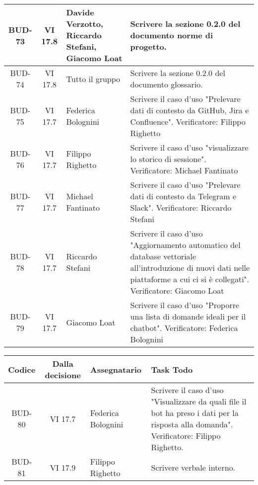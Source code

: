 \begin{table}[htbp]
\begin{tabular}{|c|c|p{}|p{}|}
    \hline
    BUD-73 & VI 17.8 & Davide Verzotto, Riccardo Stefani, Giacomo Loat & Scrivere la sezione 0.2.0 del documento norme di progetto. \\
    \hline
    BUD-74 & VI 17.8 & Tutto il gruppo & Scrivere la sezione 0.2.0 del documento glossario. \\
    \hline
    BUD-75 & VI 17.7 & Federica Bolognini & Scrivere il caso d'uso "Prelevare dati di contesto da GitHub, Jira e Confluence". Verificatore: Filippo Righetto \\
    \hline
    BUD-76 & VI 17.7 & Filippo Righetto & Scrivere il caso d'uso "visualizzare lo storico di sessione". Verificatore: Michael Fantinato \\
    \hline
    BUD-77 & VI 17.7 & Michael Fantinato & Scrivere il caso d'uso "Prelevare dati di contesto da Telegram e Slack". Verificatore: Riccardo Stefani\\
    \hline
    BUD-78 & VI 17.7 & Riccardo Stefani & Scrivere il caso d'uso "Aggiornamento automatico del database vettoriale all'introduzione di nuovi dati nelle piattaforme a cui ci si è collegati". Verificatore: Giacomo Loat\\
    \hline
    BUD-79 & VI 17.7 & Giacomo Loat & Scrivere il caso d'uso "Proporre una lista di domande ideali per il chatbot". Verificatore: Federica Bolognini\\
    \hline
\end{tabular}
\end{table}

\vspace{0.5cm}
\newpage
\begin{table}[htbp]
\centering
{}
\begin{tabular}{|c|c|p{}|p{}|}
    \hline
    \rowcolor[gray]{0.75}
    \textbf{Codice} & \textbf{Dalla decisione} & \textbf{Assegnatario} & \textbf{Task Todo} \\ 
    \hline
    BUD-80 & VI 17.7 & Federica Bolognini & Scrivere il caso d'uso "Visualizzare da quali file il bot ha preso i dati per la risposta alla domanda". Verificatore: Filippo Righetto. \\ 
    \hline
    BUD-81 & VI 17.9 & Filippo Righetto & Scrivere verbale interno. \\ 
    \hline
\end{tabular}
\end{table}


